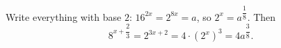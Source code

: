 Write everything with base $2$: $16^{2x}=2^{8x}=a$, so $2^x=a^{\dfrac18}$. Then
\[8^{x+\dfrac23}=2^{3x+2}=4\cdot\left(2^x\right)^3=\boxed{4a^{\dfrac38}}.\]
